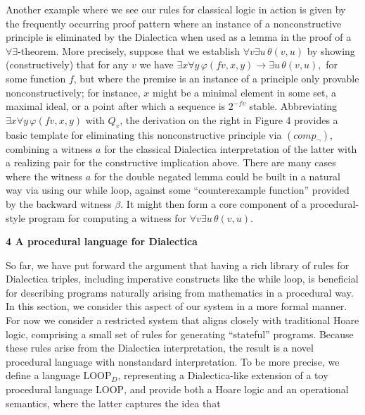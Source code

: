 Another example where we see our rules for classical logic in action is given by the frequently occurring proof pattern where an instance of a nonconstructive principle is eliminated by the Dialectica when used as a lemma in the proof of a $\forall\exists$-theorem. More precisely, suppose that we establish $\forall v\exists u\,\theta(v,u)$ by showing (constructively) that for any $v$ we have $\exists x\forall y\,\varphi(fv,x,y)\to\exists u\,\theta(v,u),$ for some function $f$, but where the premise is an instance of a principle only provable nonconstructively; for instance, $x$ might be a minimal element in some set, a maximal ideal, or a point after which a sequence is $2^{-fv}$ stable. Abbreviating $\exists x\forall y\,\varphi(fv,x,y)$ with $Q_{v}$, the derivation on the right in Figure 4 provides a basic template for eliminating this nonconstructive principle via $(comp_{\neg})$, combining a witness $a$ for the classical Dialectica interpretation of the latter with a realizing pair for the constructive implication above. There are many cases where the witness $a$ for the double negated lemma could be built in a natural way via using our while loop, against some “counterexample function” provided by the backward witness $\beta$. It might then form a core component of a procedural-style program for computing a witness for $\forall v\exists u\,\theta(v,u)$.\par
 
 
 
 


 
\par\medskip\noindent\textbf{4 A procedural language for Dialectica}\par
 
 
So far, we have put forward the argument that having a rich library of rules for Dialectica triples, including imperative constructs like the while loop, is beneficial for describing programs naturally arising from mathematics in a procedural way. In this section, we consider this aspect of our system in a more formal manner. For now we consider a restricted system that aligns closely with traditional Hoare logic, comprising a small set of rules for generating “stateful” programs. Because these rules arise from the Dialectica interpretation, the result is a novel procedural language with nonstandard interpretation. To be more precise, we define a language $\mathrm{LOOP}_{D}$, representing a Dialectica-like extension of a toy procedural language $\mathrm{LOOP}$, and provide both a Hoare logic and an operational semantics, where the latter captures the idea that\par
  
